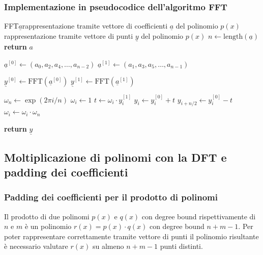 \subsubsection*{Implementazione in pseudocodice dell'algoritmo FFT}
\begin{algo}{FFT}{$\underline{a}$}{rappresentazione tramite vettore di coefficienti $\underline{a}$ del polinomio $p(x)$}{rappresentazione tramite vettore di punti $\underline{y}$ del polinomio $p(x)$}
	\State \(n \gets \text{length}(\underline{a})\)
	\State
	 
		\State \textbf{return} \(a\)
	\EndIf

	\State
	\State \(\underline{a}^{[0]} \gets (a_0, a_2, a_4, \dots, a_{n-2})\) 
	\State \(\underline{a}^{[1]} \gets (a_1, a_3, a_5, \dots, a_{n-1})\)

	\State
	\State \(\underline{y}^{[0]} \gets \text{FFT}(\underline{a}^{[0]})\) 
	\State \(\underline{y}^{[1]} \gets \text{FFT}(\underline{a}^{[1]})\)

	\State
	\State \(\omega_n \gets \exp(2 \pi i /n)\) 
	\State \(\omega_i \gets 1\)
		\State \(t \gets \omega_i \cdot y_i^{[1]}\)
		\State \(y_i \gets y_i^{[0]} + t\)
		\State \(y_{i + n/2} \gets y_i^{[0]} - t\)
		\State \(\omega_i \gets \omega_i \cdot \omega_n\)
	\EndFor
		
	\State \textbf{return} \(\underline{y}\)
\end{algo}

\newpage

\subsection{Moltiplicazione di polinomi con la DFT e padding dei coefficienti}
\subsubsection*{Padding dei coefficienti per il prodotto di polinomi}
Il prodotto di due polinomi \(p(x)\) e \(q(x)\) con degree bound rispettivamente di \(n\) e \(m\) è un polinomio
\(r(x) = p(x) \cdot q(x)\) con degree bound \(n + m - 1\). Per poter rappresentare correttamente tramite vettore di punti
il polinomio risultante è necessario valutare \(r(x)\) su almeno \(n + m - 1\) punti distinti.

